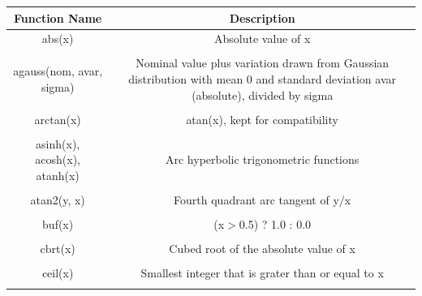 \begin{longtable}{c c}

\hline\hline %
Function Name & Description \\ [0.5ex] %
\hline %
abs(x) & Absolute value of x \\ \\ %

agauss(nom, avar, sigma) & \begin{minipage}{20em}
  Nominal value plus variation drawn from Gaussian distribution 
	with mean 0 and standard deviation avar (absolute), divided by sigma
\end{minipage}\\ \\

arctan(x) & \begin{minipage}{20em}
atan(x), kept for compatibility
\end{minipage}\\ \\

asinh(x), acosh(x), atanh(x) & \begin{minipage}{20em}
Arc hyperbolic trigonometric functions
\end{minipage}\\ \\

atan2(y, x) & \begin{minipage}{20em}
Fourth quadrant arc tangent of y$/$x
\end{minipage}\\ \\

buf(x) & \begin{minipage}{20em}
(x$>$0.5) ? 1.0 : 0.0
\end{minipage}\\ \\

cbrt(x) & \begin{minipage}{20em}
Cubed root of the absolute value of x
\end{minipage}\\ \\

ceil(x) & \begin{minipage}{20em}
Smallest integer that is grater than or equal to x
\end{minipage}\\ \\


\end{longtable}
